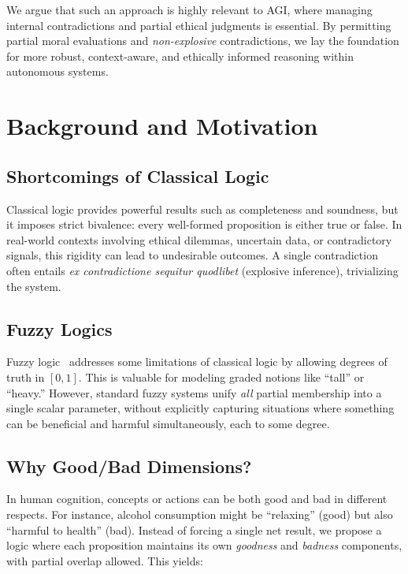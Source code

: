 \documentclass[11pt]{article}
\begin{document}
We argue that such an approach is highly relevant to AGI, where managing internal contradictions 
and partial ethical judgments is essential. By permitting partial moral evaluations and 
\emph{non-explosive} contradictions, we lay the foundation for more robust, context-aware, 
and ethically informed reasoning within autonomous systems.

\section{Background and Motivation}

\subsection{Shortcomings of Classical Logic}

Classical logic provides powerful results such as completeness and soundness, 
but it imposes strict bivalence: every well-formed proposition is either true or false. 
In real-world contexts involving ethical dilemmas, uncertain data, or contradictory signals, 
this rigidity can lead to undesirable outcomes. A single contradiction often entails 
\emph{ex contradictione sequitur quodlibet} (explosive inference), trivializing the system.

\subsection{Fuzzy Logics}

Fuzzy logic~\cite{zadeh1965fuzzy} addresses some limitations of classical logic by allowing degrees 
of truth in \([0,1]\). This is valuable for modeling graded notions like ``tall'' or 
``heavy.'' However, standard fuzzy systems unify \emph{all} partial membership into a single 
scalar parameter, without explicitly capturing situations where something can be 
beneficial and harmful simultaneously, each to some degree.

\subsection{Why Good/Bad Dimensions?}

In human cognition, concepts or actions can be both good and bad in different respects. 
For instance, alcohol consumption might be ``relaxing'' (good) but also ``harmful to health'' 
(bad). Instead of forcing a single net result, we propose a logic where each proposition 
maintains its own \emph{goodness} and \emph{badness} components, with partial overlap allowed. 
This yields:
\end{document}
